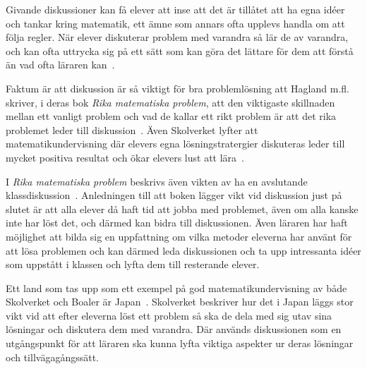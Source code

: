 \textcolor{turkos} {
Givande diskussioner kan få elever att inse att det är tillåtet att ha egna idéer och tankar kring matematik, ett ämne som annars ofta upplevs handla om att följa regler. När elever diskuterar problem med varandra så lär de av varandra, och kan ofta uttrycka sig på ett sätt som kan göra det lättare för dem att förstå än vad ofta läraren kan~\cite{TheElephant}.
}

\textcolor{turkos} {Faktum är att diskussion är så viktigt för bra problemlösning att Hagland m.fl. skriver, i deras bok \textit{Rika matematiska problem}, att den viktigaste skillnaden mellan ett vanligt problem och vad de kallar ett rikt problem är att det rika problemet leder till diskussion~\cite{RikaProblem}. Även Skolverket lyfter att matematikundervisning där elevers egna lösningstratergier diskuteras leder till mycket positiva resultat och ökar elevers lust att lära~\cite{Skolverket03}.}

\textcolor{turkos}{I \textit{Rika matematiska problem} beskrivs även vikten av ha en avslutande klassdiskussion~\cite{RikaProblem}. Anledningen till att boken lägger vikt vid diskussion just på slutet är att alla elever då haft tid att jobba med problemet, även om alla kanske inte har löst det, och därmed kan bidra till diskussionen. Även läraren har haft möjlighet att bilda sig en uppfattning om vilka metoder eleverna har använt för att lösa problemen och kan därmed leda diskussionen och ta upp intressanta idéer som uppstått i klassen och lyfta dem till resterande elever.}

\textcolor{turkos} {
Ett land som tas upp som ett exempel på god matematikundervisning av både Skolverket och Boaler är Japan~\cite{TheElephant}\cite{Skolverket03}. Skolverket beskriver hur det i Japan läggs stor vikt vid att efter eleverna löst ett problem så ska de dela med sig utav sina lösningar och diskutera dem med varandra. Där används diskussionen som en utgångspunkt för att läraren ska kunna lyfta viktiga aspekter ur deras lösningar och tillvägagångssätt.}







